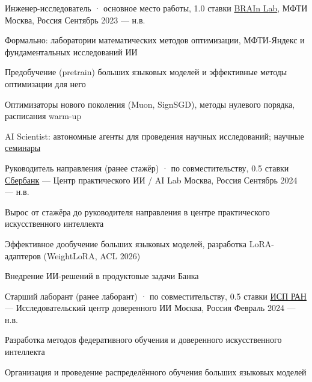 
\begin{cventries}

  \cventry
    {Инженер-исследователь \textnormal{· основное место работы, 1.0 ставки}} %
    {\href{https://github.com/brain-lab-research}{BRAIn Lab}, МФТИ} %
    {Москва, Россия} %
    {Сентябрь 2023 — н.в.} %
    {
      \begin{cvitems}
        \item {Формально: лаборатории математических методов оптимизации, МФТИ-Яндекс и фундаментальных исследований ИИ}
        \item {Предобучение (pretrain) больших языковых моделей и эффективные методы оптимизации для него}
        \item {Оптимизаторы нового поколения (Muon, SignSGD), методы нулевого порядка, расписания warm-up}
        \item {AI Scientist: автономные агенты для проведения научных исследований; научные \href{https://rutube.ru/channel/16197436/videos/}{семинары}}
      \end{cvitems}
    }

  \cventry
    {Руководитель направления \textnormal{(ранее стажёр) · по совместительству, 0.5 ставки}} %
    {\href{https://sberlabs.com/laboratories/sber-ai-lab}{Сбербанк} — Центр практического ИИ / AI Lab} %
    {Москва, Россия} %
    {Сентябрь 2024 — н.в.} %
    {
      \begin{cvitems}
        \item {Вырос от стажёра до руководителя направления в центре практического искусственного интеллекта}
        \item {Эффективное дообучение больших языковых моделей, разработка LoRA-адаптеров (WeightLoRA, ACL 2026)}
        \item {Внедрение ИИ-решений в продуктовые задачи Банка}
      \end{cvitems}
    }

  \cventry
    {Старший лаборант \textnormal{(ранее лаборант) · по совместительству, 0.5 ставки}} %
    {\href{https://www.ispras.ru}{ИСП РАН} — Исследовательский центр доверенного ИИ} %
    {Москва, Россия} %
    {Февраль 2024 — н.в.} %
    {
      \begin{cvitems}
        \item {Разработка методов федеративного обучения и доверенного искусственного интеллекта}
        \item {Организация и проведение распределённого обучения больших языковых моделей}
      \end{cvitems}
    }


\end{cventries}
